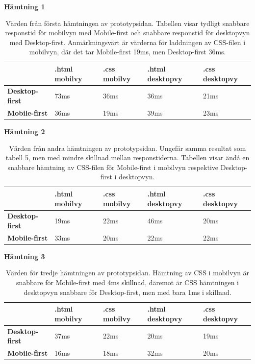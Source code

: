 \documentclass[11pt]{article}
\begin{document}
\newpage
\textbf{Hämtning 1}

\begin{table}[H]
	\centering
	\begin{tabular}{|p{2.5cm}|p{2.7cm}|p{2.4cm}|p{3.1cm}|p{2.8cm}|}
	\hline
	~&\textbf{.html mobilvy}&\textbf{.css mobilvy}&\textbf{.html desktopvy}&\textbf{.css desktopvy}\\ \hline
	\textbf{Desktop-first}&73ms&36ms&36ms&21ms\\ \hline
	\textbf{Mobile-first}&36ms&19ms&39ms&23ms \\ \hline
	\end{tabular}
    \caption {Värden från första hämtningen av prototypsidan. Tabellen visar tydligt snabbare responstid för mobilvyn med Mobile-first och snabbare responstid för desktopvyn med Desktop-first. Anmärkningsvärt är värderna för laddningen av CSS-filen i mobilvyn, där det tar Mobile-first 19ms, men Desktop-first 36ms.}
\end{table}

\textbf{Hämtning 2}

\begin{table}[H]
	\centering
	\begin{tabular}{|p{2.5cm}|p{2.7cm}|p{2.4cm}|p{3.1cm}|p{2.8cm}|}
	\hline
	~&\textbf{.html mobilvy}&\textbf{.css mobilvy}&\textbf{.html desktopvy}&\textbf{.css desktopvy}\\ \hline
	\textbf{Desktop-first}&19ms&22ms&46ms&20ms\\ \hline
	\textbf{Mobile-first}&33ms&20ms&22ms&22ms \\ \hline
	\end{tabular}
    \caption {Värden från andra hämtningen av prototypsidan. Ungefär samma resultat som tabell 5, men med mindre skillnad mellan responstiderna. Tabellen visar ändå en snabbare hämtning av CSS-filen för Mobile-first i mobilvyn respektive Desktop-first i desktopvyn.}
\end{table}

\textbf{Hämtning 3}

\begin{table}[H]
	\centering
	\begin{tabular}{|p{2.5cm}|p{2.7cm}|p{2.4cm}|p{3.1cm}|p{2.8cm}|}
	\hline
	~&\textbf{.html mobilvy}&\textbf{.css mobilvy}&\textbf{.html desktopvy}&\textbf{.css desktopvy}\\ \hline
	\textbf{Desktop-first}&37ms&22ms&20ms&19ms\\ \hline
	\textbf{Mobile-first}&16ms&18ms&32ms&20ms \\ \hline
	\end{tabular}
    \caption {Värden för tredje hämtningen av prototypsidan. Hämtning av CSS i mobilvyn är snabbare för Mobile-first med 4ms skillnad, däremot är CSS hämtningen i desktopvyn snabbare för Desktop-first, men med bara 1ms i skillnad.}
\end{table}
\end{document}
